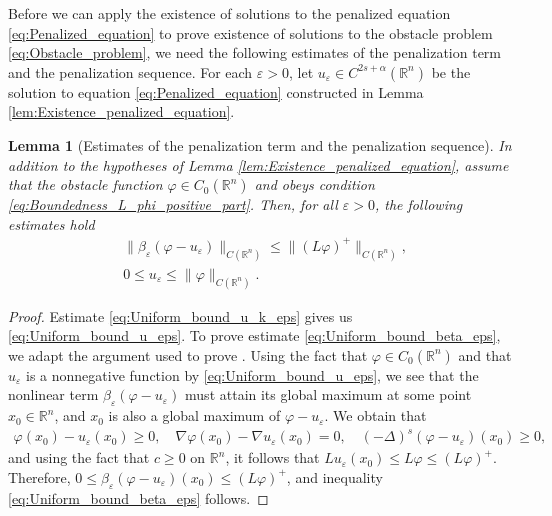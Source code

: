 \documentclass[11pt,reqno]{amsart}
\newtheorem{lem}[thm]{Lemma}
\theoremstyle{definition}
\theoremstyle{remark}
\begin{document}
Before we can apply the existence of solutions to the penalized equation \eqref{eq:Penalized_equation} to prove existence of solutions to the obstacle problem \eqref{eq:Obstacle_problem}, we need the following estimates of the penalization term and the penalization sequence. For each ${\varepsilon}>0$, let $u_{\varepsilon}\in C^{2s+\alpha}({\mathbb{R}}^n)$ be the solution to equation \eqref{eq:Penalized_equation} constructed in Lemma \ref{lem:Existence_penalized_equation}.

\begin{lem}[Estimates of the penalization term and the penalization sequence]
\label{lem:Estimates_penalization_equation}
In addition to the hypotheses of Lemma \ref{lem:Existence_penalized_equation}, assume that the obstacle function $\varphi\in C_0({\mathbb{R}}^n)$ and obeys condition \eqref{eq:Boundedness_L_phi_positive_part}. Then, for all ${\varepsilon}>0$, the following estimates hold
\begin{align}
\label{eq:Uniform_bound_beta_eps}
&\|\beta_{\varepsilon}(\varphi-u_{\varepsilon})\|_{C({\mathbb{R}}^n)} \leq \|(L\varphi)^+\|_{C({\mathbb{R}}^n)},\\
\label{eq:Uniform_bound_u_eps}
&0\leq u_{\varepsilon} \leq \|\varphi\|_{C({\mathbb{R}}^n)}.
\end{align} 
\end{lem}

\begin{proof}
Estimate \eqref{eq:Uniform_bound_u_k_eps} gives us \eqref{eq:Uniform_bound_u_eps}. To prove estimate \eqref{eq:Uniform_bound_beta_eps}, we adapt the argument used to prove \cite[Lemma 1.3.1]{Friedman_1982}. Using the fact that  $\varphi\in C_0({\mathbb{R}}^n)$ and that $u_{\varepsilon}$ is a nonnegative function by \eqref{eq:Uniform_bound_u_eps}, we see that the nonlinear term $\beta_{\varepsilon}(\varphi-u_{\varepsilon})$ must attain its global maximum at some point $x_0\in{\mathbb{R}}^n$, and $x_0$ is also a global maximum of $\varphi-u_{\varepsilon}$. We obtain that
\begin{align*}
\varphi(x_0)-u_{\varepsilon}(x_0)\geq 0, \quad \nabla \varphi(x_0) - \nabla u_{\varepsilon}(x_0)=0,\quad (-\Delta)^s(\varphi-u_{\varepsilon})(x_0) \geq 0, 
\end{align*}
and using the fact that $c\geq 0$ on ${\mathbb{R}}^n$, it follows that $L u_{\varepsilon} (x_0) \leq L\varphi \leq (L\varphi)^+ $. Therefore, $0\leq\beta_{\varepsilon}(\varphi-u_{\varepsilon})(x_0) \leq (L\varphi)^+$, and inequality \eqref{eq:Uniform_bound_beta_eps} follows.
\end{proof}
\end{document}
